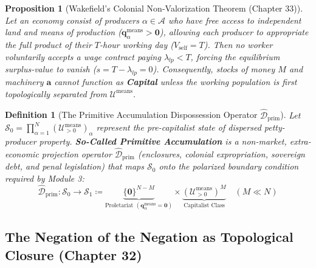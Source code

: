 \documentclass[11pt,a4paper]{article}
\newtheorem{definition}{Definition}[section]
\newtheorem{proposition}{Proposition}[section]
\begin{document}
\begin{proposition}[Wakefield's Colonial Non-Valorization Theorem (Chapter 33)]
Let an economy consist of producers $\alpha \in \mathcal{A}$ who have free access to independent land and means of production ($\mathbf{q}_\alpha^{\text{means}} > \mathbf{0}$), allowing each producer to appropriate the full product of their $T$-hour working day ($V_{\text{self}} = T$). Then no worker voluntarily accepts a wage contract paying $\lambda_{lp} < T$, forcing the equilibrium surplus-value to vanish ($s = T - \lambda_{lp} = 0$). Consequently, stocks of money $M$ and machinery $\mathbf{a}$ cannot function as \textbf{Capital} unless the working population is first topologically separated from $\mathcal{U}^{\text{means}}$.
\end{proposition}

\begin{definition}[The Primitive Accumulation Dispossession Operator $\hat{\mathcal{D}}_{\text{prim}}$]
Let $\mathcal{S}_0 = \prod_{\alpha=1}^N \left(\mathcal{U}^{\text{means}}_{>0}\right)_\alpha$ represent the pre-capitalist state of dispersed petty-producer property. \textbf{So-Called Primitive Accumulation} is a non-market, extra-economic projection operator $\hat{\mathcal{D}}_{\text{prim}}$ (enclosures, colonial expropriation, sovereign debt, and penal legislation) that maps $\mathcal{S}_0$ onto the polarized boundary condition required by Module 3:
\begin{equation}
    \hat{\mathcal{D}}_{\text{prim}} : \mathcal{S}_0 \longrightarrow \mathcal{S}_1 \coloneqq \underbrace{\{\mathbf{0}\}^{N - M}}_{\text{Proletariat } (\mathbf{q}_\alpha^{\text{means}} = \mathbf{0})} \times \underbrace{\left(\mathcal{U}^{\text{means}}_{>0}\right)^M}_{\text{Capitalist Class}} \quad (M \ll N)
\end{equation}
\end{definition}

\subsection{The Negation of the Negation as Topological Closure (Chapter 32)}
\end{document}
